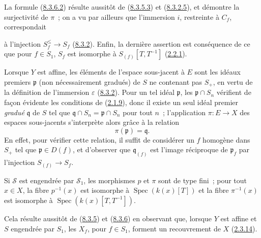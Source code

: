 La formule (\hyperref[II.8.3.6.2-fr]{8.3.6.2}) résulte aussitôt de
(\hyperref[II.8.3.5.3-fr]{8.3.5.3}) et
(\hyperref[II.8.3.2.5-fr]{8.3.2.5}), et démontre la surjectivité de $\pi$~; on
a vu par ailleurs que l'immersion $i$, restreinte à $C_f$, correspondait

à l'injection $S_f^{\leq}\to S_f$ (\hyperref[II.8.3.2-fr]{8.3.2}). Enfin, la
dernière assertion est conséquence de ce que pour $f\in S_1$, $S_f$ est
isomorphe à $S_{(f)}[T,T^{-1}]$ (\hyperref[II.2.2.1-fr]{2.2.1}).

\begin{remark}[8.3.7]
\label{II.8.3.7-fr}
Lorsque $Y$ est affine, les éléments de l'espace sous-jacent à $E$ sont les
idéaux premiers $\mathfrak{p}$ (non nécessairement gradués) de $S$ ne
contenant pas $S_+$, en vertu de la définition de l'immersion $\varepsilon$
(\hyperref[II.8.3.2-fr]{8.3.2}). Pour un tel idéal $\mathfrak{p}$, les
$\mathfrak{p}\cap S_n$ vérifient de façon évidente les conditions de
(\hyperref[II.2.1.9-fr]{2.1.9}), donc il existe un seul idéal premier
\emph{gradué} $\mathfrak{q}$ de $S$ tel que
$\mathfrak{q}\cap S_n=\mathfrak{p}\cap S_n$ pour tout $n$~; l'application
$\pi:E\to X$ des espaces sous-jacents s'interprète alors grâce à la relation
\begin{equation}
\label{II.8.3.7.1-fr}
  \pi(\mathfrak{p})=\mathfrak{q}.
\tag{8.3.7.1}
\end{equation}
En effet, pour vérifier cette relation, il suffit de considérer un $f$
homogène dans $S_+$ tel que $\mathfrak{p}\in D(f)$, et d'observer que
$\mathfrak{q}_{(f)}$ est l'image réciproque de $\mathfrak{p}_f$ par
l'injection $S_{(f)}\to S_f$.
\end{remark}

\begin{corollary}[8.3.8]
\label{II.8.3.8-fr}
Si $\mathcal{S}$ est engendrée par $\mathcal{S}_1$, les morphismes $p$ et
$\pi$ sont de type fini~; pour tout $x\in X$, la fibre $p^{-1}(x)$ est
isomorphe à $\operatorname{Spec}(k(x)[T])$ et la fibre $\pi^{-1}(x)$ est
isomorphe à $\operatorname{Spec}(k(x)[T,T^{-1}])$.
\end{corollary}

Cela résulte aussitôt de (\hyperref[II.8.3.5-fr]{8.3.5}) et
(\hyperref[II.8.3.6-fr]{8.3.6}) en observant que, lorsque $Y$ est affine et
$S$ engendrée par $S_1$, les $X_f$, pour $f\in S_1$, forment un recouvrement
de $X$ (\hyperref[II.2.3.14-fr]{2.3.14}).

